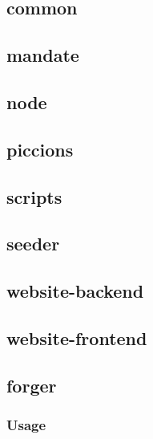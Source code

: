 \documentclass[../documentation.tex]{subfiles}
\begin{document}
\subsection{common}


\subsection{mandate}


\subsection{node}


\subsection{piccions}


\subsection{scripts}


\subsection{seeder}


\subsection{website-backend}


\subsection{website-frontend}


\subsection{forger}

\subsubsection{Usage}
\end{document}
